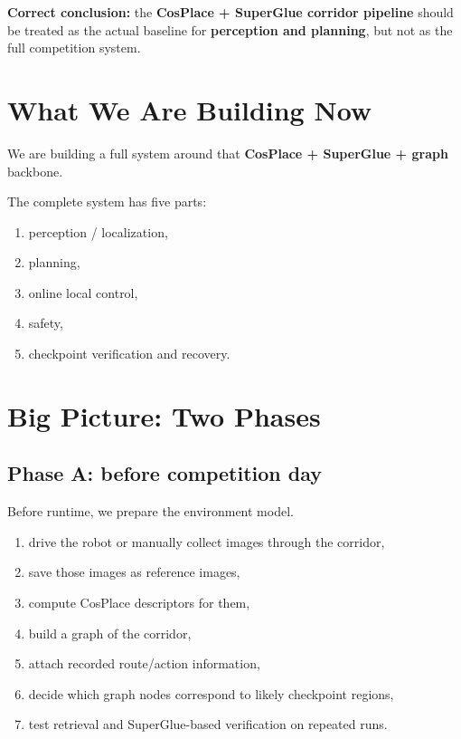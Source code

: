 \documentclass[11pt,a4paper]{article}
\begin{document}
\begin{mdframed}
\textbf{Correct conclusion:} the \textbf{CosPlace + SuperGlue corridor pipeline}
should be treated as the actual baseline for \textbf{perception and planning},
but not as the full competition system.
\end{mdframed}


\section{What We Are Building Now}

We are building a full system around that \textbf{CosPlace + SuperGlue + graph}
backbone.

The complete system has five parts:

\begin{enumerate}[nosep]
  \item perception / localization,
  \item planning,
  \item online local control,
  \item safety,
  \item checkpoint verification and recovery.
\end{enumerate}


\section{Big Picture: Two Phases}

\subsection{Phase A: before competition day}

Before runtime, we prepare the environment model.

\begin{enumerate}[nosep]
  \item drive the robot or manually collect images through the corridor,
  \item save those images as reference images,
  \item compute CosPlace descriptors for them,
  \item build a graph of the corridor,
  \item attach recorded route/action information,
  \item decide which graph nodes correspond to likely checkpoint regions,
  \item test retrieval and SuperGlue-based verification on repeated runs.
\end{enumerate}
\end{document}
